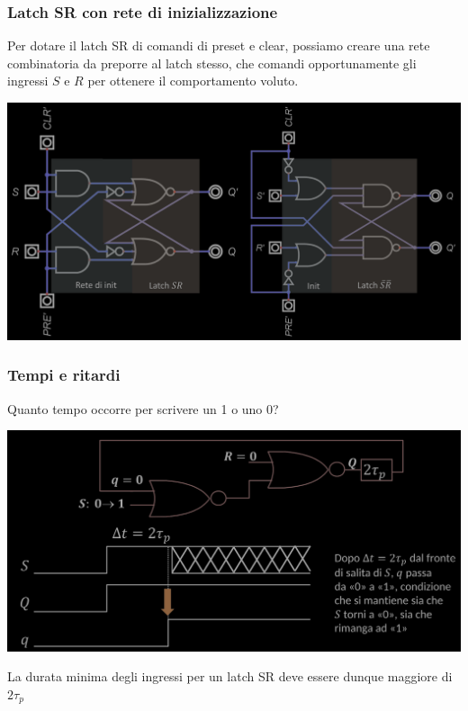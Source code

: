 \documentclass{article}
\begin{document}
\subsubsection{Latch SR con rete di inizializzazione}
Per dotare il latch SR di comandi di preset e clear, possiamo creare una rete combinatoria da preporre al latch stesso, che comandi opportunamente gli ingressi $S$ e $R$ per ottenere il comportamento voluto.
\begin{center}
    \includegraphics[scale=0.35]{latch cd init.png}
\end{center}





\subsubsection*{Tempi e ritardi}
Quanto tempo occorre per scrivere un 1 o uno 0?
\begin{center}
    \includegraphics[scale=0.37]{tempi-ritardi.png}
\end{center}
La durata minima degli ingressi per un latch SR deve essere dunque maggiore di $2 \tau _{p}$
\end{document}
